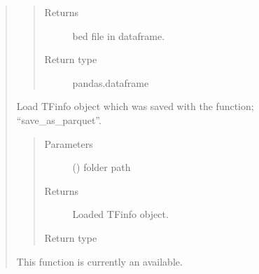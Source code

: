 \documentclass[letterpaper,10pt,english]{sphinxmanual}
\begin{document}
\begin{quote}
\begin{fulllineitems}
\begin{quote}
\begin{description}
\item[{Returns}] \leavevmode
bed file in dataframe.

\item[{Return type}] \leavevmode
pandas.dataframe

\end{description}\end{quote}

\end{fulllineitems}


\begin{fulllineitems}
\label{\detokenize{modules/celloracle.motif_analysis:celloracle.motif_analysis.load_TFinfo_from_parquets}}
Load TFinfo object which was saved with the function; “save\_as\_parquet”.
\begin{quote}\begin{description}
\item[{Parameters}] \leavevmode
{} () \textendash{} folder path

\item[{Returns}] \leavevmode
Loaded TFinfo object.

\item[{Return type}] \leavevmode
{\hyperref[\detokenize{modules/celloracle.motif_analysis:celloracle.motif_analysis.TFinfo}]{}}

\end{description}\end{quote}

\end{fulllineitems}


\begin{fulllineitems}
\label{\detokenize{modules/celloracle.motif_analysis:celloracle.motif_analysis.make_TFinfo_from_scanned_file}}
This function is currently an available.


\end{fulllineitems}
\end{quote}
\end{document}
